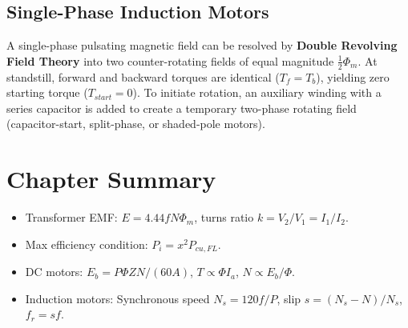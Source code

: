 \subsection{Single-Phase Induction Motors}
A single-phase pulsating magnetic field can be resolved by \textbf{Double Revolving Field Theory} into two counter-rotating fields of equal magnitude $\frac{1}{2}\Phi_m$. At standstill, forward and backward torques are identical ($T_f = T_b$), yielding zero starting torque ($T_{start} = 0$). To initiate rotation, an auxiliary winding with a series capacitor is added to create a temporary two-phase rotating field (capacitor-start, split-phase, or shaded-pole motors).

\section{Chapter Summary}
\begin{itemize}[leftmargin=1.5em]
    \item Transformer EMF: $E = 4.44 f N \Phi_m$, turns ratio $k = V_2/V_1 = I_1/I_2$.
    \item Max efficiency condition: $P_i = x^2 P_{cu,FL}$.
    \item DC motors: $E_b = P\Phi Z N / (60A)$, $T \propto \Phi I_a$, $N \propto E_b / \Phi$.
    \item Induction motors: Synchronous speed $N_s = 120f/P$, slip $s = (N_s - N)/N_s$, $f_r = s f$.
\end{itemize}
